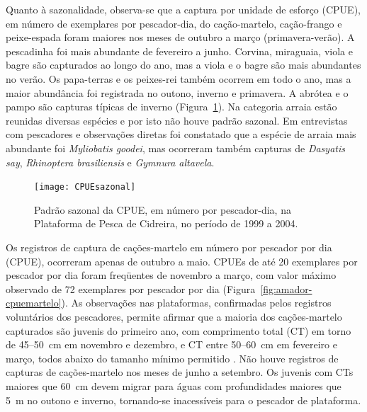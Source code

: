 \documentclass[a4paper,11pt,twoside,showtrims,onecolumn,openright,final]{memoir}
\begin{document}
Quanto à sazonalidade, observa-se que a captura por unidade de esforço (CPUE), 
em número de exemplares por pescador-dia, do cação-martelo, cação-frango e peixe-espada 
foram maiores nos meses de outubro a março (primavera-verão). A pescadinha foi mais abundante 
de fevereiro a junho. Corvina, miraguaia, viola e bagre são capturados ao longo do ano, mas 
a viola e o bagre são mais abundantes no verão. Os papa-terras e os peixes-rei também ocorrem 
em todo o ano, mas a maior abundância foi registrada no outono, inverno e primavera. 
A abrótea e o pampo são capturas típicas de inverno (Figura~\ref{fig:amador-cpuesazonal}). 
Na categoria arraia estão reunidas diversas espécies e por isto não houve padrão sazonal. 
Em entrevistas com pescadores e observações diretas foi constatado que a espécie de arraia 
mais abundante foi \emph{Myliobatis goodei}, mas ocorreram também capturas de
\emph{Dasyatis say}, \emph{Rhinoptera brasiliensis} e \emph{Gymnura altavela}. 


%
%

\begin{figure}
\begin{center}
\texttt{[image: CPUEsazonal]}
\end{center}
\caption[Padrão sazonal da CPUE na Plataforma de Pesca de Cidreira, no período de 1999 a 2004.]
        {Padrão sazonal da CPUE, em número por pescador-dia, 
         na Plataforma de Pesca de Cidreira, no período de 1999 a 2004.}
\label{fig:amador-cpuesazonal}
\end{figure}


Os registros de captura de cações-martelo em número por pescador por dia (CPUE), 
ocorreram apenas de outubro a maio. CPUEs de até 20 exemplares por pescador por dia 
foram freqüentes de novembro a março, com valor máximo observado de 72 exemplares por 
pescador por dia (Figura~\ref{fig:amador-cpuemartelo}). 
As observações nas plataformas, confirmadas pelos registros voluntários dos pescadores, 
permite afirmar que a maioria dos cações-martelo capturados são juvenis do primeiro ano, 
com comprimento total (CT) em torno de 45--50~cm em novembro e dezembro, e CT 
entre 50--60~cm em fevereiro e março, todos abaixo do tamanho mínimo permitido \citep[CT = 60~cm]{ibama2003c}. 
Não houve registros de capturas de cações-martelo nos meses de junho a setembro.
Os juvenis com CTs maiores que 60~cm devem migrar para águas com profundidades maiores 
que 5~m no outono e inverno, tornando-se inacessíveis 
para o pescador de plataforma.
\end{document}
